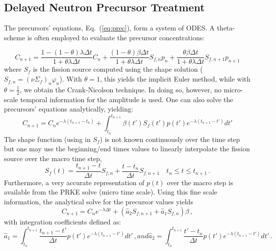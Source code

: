 \documentclass{elsarticle}
\newcommand{\eqt}[1]{Eq.~(\ref{#1})}                     %
\newcommand{\be}{\begin{equation}}
\newcommand{\ee}{\end{equation}}
\begin{document}
\subsection{Delayed Neutron Precursor Treatment}


The precursors' equations, \eqt{eq:prec}, form a system of ODES. %
A theta-scheme is often employed to evaluate the precursor concentrations:

\be
C_{n+1} = \frac{1-(1-\theta) \lambda\Delta t}{1+\theta \lambda\Delta t}C_n + \frac{(1-\theta) \beta\Delta t}{1+\theta \lambda\Delta t}S_{f,n} p_n +  \frac{\theta \beta\Delta t}{1+\theta \lambda\Delta t}S_{f,n+1} p_{n+1}
\label{eq:dnp_theta}
\ee
where $S_f$ is the fission source computed using the shape solution ($S_{f,n}=(\nu\Sigma_f)_n\varphi_n$). With
$\theta=1$, this yields the implicit Euler method, while with $\theta=\tfrac 1 2$, we obtain the Crank-Nicolson technique. In doing so, however, no micro-scale temporal information for the amplitude is used.
One can also solve the precursors' equations analytically, yielding:
\be
C_{n+1} =  C_n e^{-\lambda (t_{n+1} - t_n) }  + \int_{t_n}^{t_{n+1}} \beta(t') S_f(t') p(t')e^{-\lambda (t_{n+1}-t')}dt'
\label{eq:prec_an}
\ee
The shape function (using in $S_f$) is not known continuously over the time step but one may use the beginning/end times values
to linearly interpolate the fission source over the macro time step,
\be
S_f(t) = \frac{t_{n+1}-t}{\Delta t}S_{f,n}  + \frac{t-t_n}{\Delta t}S_{f,n+1}  \quad t_n \le t \le t_{n+1} \,.
\ee
Furthermore, a very accurate representation of $p(t)$ over the macro step is available from the PRKE solve (micro time scale). 
Using this fine scale information, the analytical solve for the precursor values yields
\be
C_{n+1} = C_n e^{-\lambda \Delta t} + \left(\hat{a}_2 S_{f,n+1}+\hat{a}_1 S_{f,n}\right)\beta \,,
\label{eq:dnp_an}
\ee
with integration coefficients defined as:
\begin{subequations}
\be
\hat{a}_1= \int_{t_n}^{t_{n+1}}\frac{t_{n+1}-t'}{\Delta t}p(t')e^{-\lambda(t_{n+1}-t')}dt' \,,
\ee
and
\be
\hat{a}_2 = \int_{t_n}^{t_{n+1}}\frac{t'-t_n}{\Delta t}p(t')e^{-\lambda(t_{n+1}-t')}dt'  \,.
\ee
\end{subequations}
\end{document}
